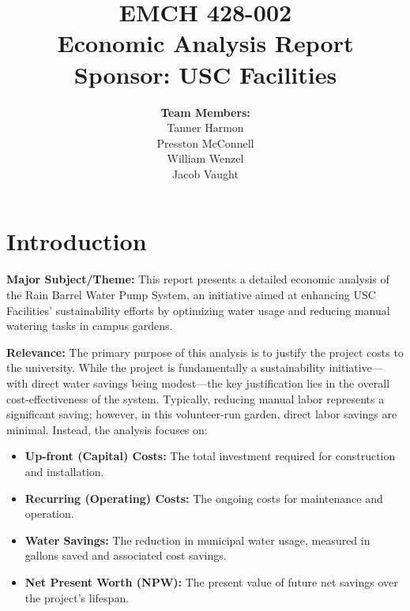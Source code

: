 \documentclass[12pt]{article}
\begin{document}
\title{
    \vspace{2in}
    \textbf{EMCH 428-002}\\[1ex]
    \textbf{Economic Analysis Report}\\[1ex]
    \textbf{Sponsor: USC Facilities}\\[1ex]
    \vspace{2in}
}

\author{
    \textbf{Team Members:}\\[2ex]
    Tanner Harmon\\[1ex]
    Presston McConnell\\[1ex]
    William Wenzel\\[1ex]
    Jacob Vaught\\[2ex]
}

\date{}

\maketitle
\thispagestyle{fancy}
\newpage

\section*{Introduction}
\vspace{-0.5em}
\textbf{Major Subject/Theme:}  
This report presents a detailed economic analysis of the Rain Barrel Water Pump System, an initiative aimed at enhancing USC Facilities' sustainability efforts by optimizing water usage and reducing manual watering tasks in campus gardens.

\noindent
\textbf{Relevance:}  
The primary purpose of this analysis is to justify the project costs to the university. While the project is fundamentally a sustainability initiative—with direct water savings being modest—the key justification lies in the overall cost-effectiveness of the system. Typically, reducing manual labor represents a significant saving; however, in this volunteer-run garden, direct labor savings are minimal. Instead, the analysis focuses on:
\begin{itemize}
    \item \textbf{Up-front (Capital) Costs:} The total investment required for construction and installation.
    \item \textbf{Recurring (Operating) Costs:} The ongoing costs for maintenance and operation.
    \item \textbf{Water Savings:} The reduction in municipal water usage, measured in gallons saved and associated cost savings.
    \item \textbf{Net Present Worth (NPW):} The present value of future net savings over the project’s lifespan.
\end{itemize}
\end{document}
